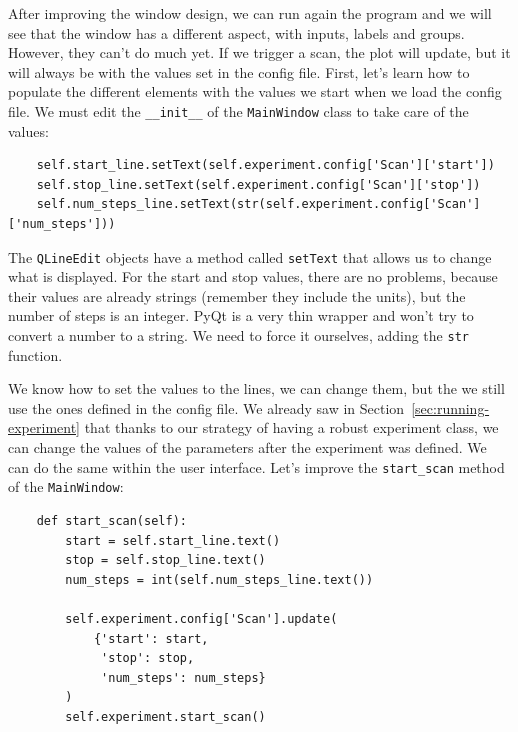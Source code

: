 
After improving the window design, we can run again the program and we will see that the window has a different aspect, with inputs, labels and groups. However, they can't do much yet. If we trigger a scan, the plot will update, but it will always be with the values set in the config file. First, let's learn how to populate the different elements with the values we start when we load the config file. We must edit the \texttt{\_\_init\_\_} of the \texttt{MainWindow} class to take care of the values:

\begin{verbatim}
    self.start_line.setText(self.experiment.config['Scan']['start'])
    self.stop_line.setText(self.experiment.config['Scan']['stop'])
    self.num_steps_line.setText(str(self.experiment.config['Scan']['num_steps']))
\end{verbatim}

The \texttt{QLineEdit} objects have a method called \texttt{setText} that allows us to change what is displayed. For the start and stop values, there are no problems, because their values are already strings (remember they include the units), but the number of steps is an integer. PyQt is a very thin wrapper and won't try to convert a number to a string. We need to force it ourselves, adding the \texttt{str} function.


We know how to set the values to the lines, we can change them, but the we still use the ones defined in the config file. We already saw in Section~\ref{sec:running-experiment} that thanks to our strategy of having a robust experiment class, we can change the values of the parameters after the experiment was defined. We can do the same within the user interface. Let's improve the \texttt{start\_scan} method of the \texttt{MainWindow}:

\begin{verbatim}
    def start_scan(self):
        start = self.start_line.text()
        stop = self.stop_line.text()
        num_steps = int(self.num_steps_line.text())

        self.experiment.config['Scan'].update(
            {'start': start,
             'stop': stop,
             'num_steps': num_steps}
        )
        self.experiment.start_scan()
\end{verbatim}

